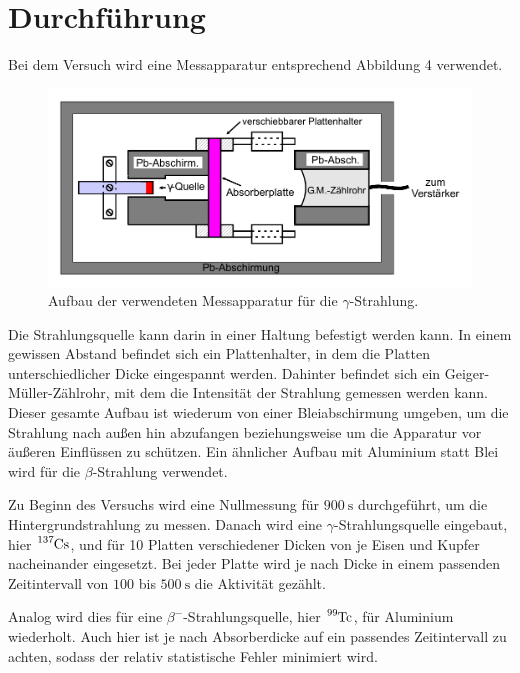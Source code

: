 \section{Durchführung}
\label{sec:Durchführung}

Bei dem Versuch wird eine Messapparatur entsprechend Abbildung 4 verwendet. 
\begin{figure}
    \centering
    \includegraphics[width=\linewidth]{pictures/messaparatur.pdf}
    \caption{Aufbau der verwendeten Messapparatur für die $\gamma$-Strahlung. \cite{v704}}
    \label{fig:messaparatur}
\end{figure}

Die Strahlungsquelle kann darin in einer Haltung befestigt werden kann. 
In einem gewissen Abstand befindet sich ein Plattenhalter, in dem die Platten unterschiedlicher Dicke eingespannt werden. 
Dahinter befindet sich ein Geiger-Müller-Zählrohr, mit dem die Intensität der Strahlung gemessen werden kann. 
Dieser gesamte Aufbau ist wiederum von einer Bleiabschirmung umgeben, 
um die Strahlung nach außen hin abzufangen beziehungsweise um die Apparatur vor äußeren Einflüssen zu schützen.
Ein ähnlicher Aufbau mit Aluminium statt Blei wird für die $\beta$-Strahlung verwendet.

Zu Beginn des Versuchs wird eine Nullmessung für $\qty{900}{\second}$ durchgeführt, um die Hintergrundstrahlung zu messen.
Danach wird eine $\gamma$-Strahlungsquelle eingebaut, hier $\ce{^{137}Cs}$,
und für 10 Platten verschiedener Dicken von je Eisen und Kupfer nacheinander eingesetzt.
Bei jeder Platte wird je nach Dicke in einem passenden Zeitintervall von $100$ bis $\qty{500}{\second}$ die Aktivität gezählt.

Analog wird dies für eine $\beta^-$-Strahlungsquelle, hier $\ce{^{99}Tc}$, für Aluminium wiederholt.
Auch hier ist je nach Absorberdicke auf ein passendes Zeitintervall zu achten, 
sodass der relativ statistische Fehler minimiert wird.